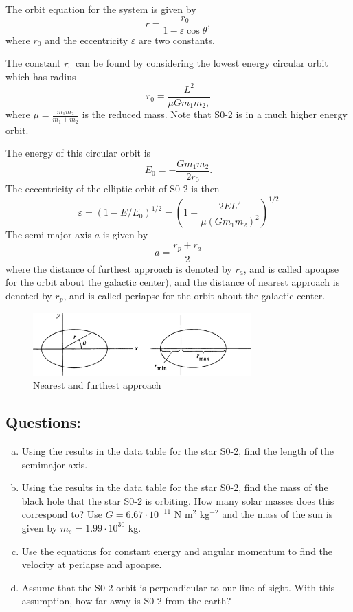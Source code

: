 \documentclass[solutions]{esg8012pset}
\begin{document}
    The orbit equation for the system is given by
    $$r = \frac{r_0}{1 - \varepsilon\cos\theta},$$
    where $r_0$ and the eccentricity $\varepsilon$ are two constants.

    The constant $r_0$ can be found by considering the lowest energy circular orbit which has radius
    $$r_0 = \frac{L^2}{\mu G m_1 m_2,}$$
    where $\mu = \frac{m_1 m_2}{m_1 + m_2}$ is the reduced mass. Note that S0-2 is in a much higher energy orbit.

    The energy of this circular orbit is
    $$E_0 = -\frac{G m_1 m_2}{2r_0}.$$
    The eccentricity of the elliptic orbit of S0-2 is then
    $$\varepsilon = (1 - E / E_0)^{1/2} = \left(1 + \frac{2 E L^2}{\mu(G m_1 m_2)^2}\right)^{1/2}$$
    The semi major axis $a$ is given by
    $$a = \frac{r_p + r_a}{2}$$
    where the distance of furthest approach is denoted by $r_a$, and is called apoapse for the orbit about the galactic center), and the distance of nearest approach is denoted by $r_p$, and is called periapse for the orbit about the galactic center.
    \begin{figure}[!h]
      \begin{center}\includegraphics[width=0.75\textwidth]{ps10_6}\end{center}
      \caption{Nearest and furthest approach}
    \end{figure}

  \subsection{Questions:}
    \begin{enumerate}[(a)]
      \item Using the results in the data table for the star S0-2, find the length of the semimajor axis.
      \item Using the results in the data table for the star S0-2, find the mass of the black hole that the star S0-2 is orbiting. How many solar masses does this correspond to?  Use $G = 6.67 \cdot 10^{-11}$ N m$^2$ kg$^{-2}$ and the mass of the sun is given by $m_s = 1.99 \cdot 10^{30}$ kg.
      \item Use the equations for constant energy and angular momentum to find the velocity at periapse and apoapse.
      \item Assume that the S0-2 orbit is perpendicular to our line of sight. With this assumption, how far away is S0-2 from the earth?
    \end{enumerate}
\end{document}
